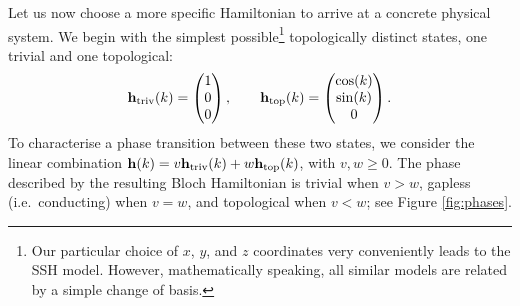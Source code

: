 Let us now choose a more specific Hamiltonian to arrive at a concrete physical system. We begin with the simplest possible\footnote{
	Our particular choice of $x$, $y$, and $z$ coordinates very conveniently leads to the SSH model. However, mathematically speaking, all similar models are related by a simple change of basis.}
topologically distinct states, one trivial and one topological:
\[
	\vb{h}_{\rm triv}(k) = \begin{pmatrix}
		1 \\ 0 \\ 0
	\end{pmatrix},\qquad \vb{h}_{\rm top}(k) = \begin{pmatrix}
		\cos(k) \\ \sin(k) \\ 0
	\end{pmatrix}.
\]
To characterise a phase transition between these two states, we consider the linear combination $\vb{h}(k) = v\vb{h}_{\rm triv}(k) + w\vb{h}_{\rm top}(k)$, with $v,w\geq0$. The phase described by the resulting Bloch Hamiltonian is trivial when $v>w$, gapless (i.e.\ conducting) when $v=w$, and topological when $v<w$; see Figure \ref{fig:phases}.
